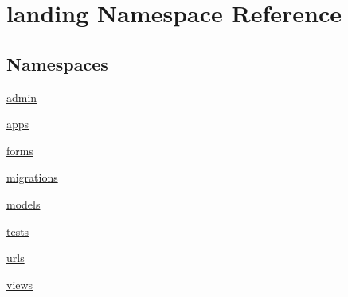 \hypertarget{namespacelanding}{}\section{landing Namespace Reference}
\label{namespacelanding}
\subsection*{Namespaces}
\begin{DoxyCompactItemize}
\item 
 \mbox{\hyperlink{namespacelanding_1_1admin}{admin}}
\item 
 \mbox{\hyperlink{namespacelanding_1_1apps}{apps}}
\item 
 \mbox{\hyperlink{namespacelanding_1_1forms}{forms}}
\item 
 \mbox{\hyperlink{namespacelanding_1_1migrations}{migrations}}
\item 
 \mbox{\hyperlink{namespacelanding_1_1models}{models}}
\item 
 \mbox{\hyperlink{namespacelanding_1_1tests}{tests}}
\item 
 \mbox{\hyperlink{namespacelanding_1_1urls}{urls}}
\item 
 \mbox{\hyperlink{namespacelanding_1_1views}{views}}
\end{DoxyCompactItemize}
